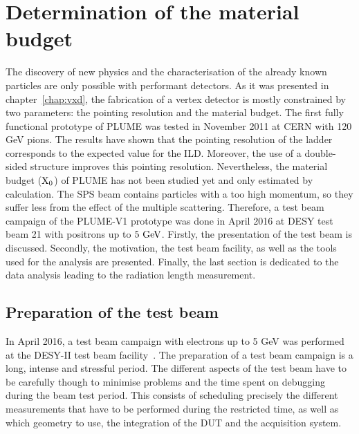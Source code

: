 \chapter{Determination of the material budget}
\label{chap:X0}

  The discovery of new physics and the characterisation of the already known particles are only possible with performant detectors.
  As it was presented in chapter~\ref{chap:vxd}, the fabrication of a vertex detector is mostly constrained by two parameters: the pointing resolution and the material budget.
  The first fully functional prototype of \gls{PLUME} was tested in November 2011 at CERN with 120 GeV pions.
  The results have shown that the pointing resolution of the ladder corresponds to the expected value for the \gls{ILD}.
  Moreover, the use of a double-sided structure improves this pointing resolution. 
  Nevertheless, the material budget ($\rm{X_0}$) of \gls{PLUME} has not been studied yet and only estimated by calculation.
  The \gls{SPS} beam contains particles with a too high momentum, so they suffer less from the effect of the multiple scattering.
  Therefore, a test beam campaign of the PLUME-V1 prototype was done in April 2016 at DESY test beam 21 with positrons up to $5~\rm{GeV}$.
  Firstly, the presentation of the test beam is discussed.
  Secondly, the motivation, the test beam facility, as well as the tools used for the analysis are presented.
  Finally, the last section is dedicated to the data analysis leading to the radiation length measurement.

\minitoc

  \section{Preparation of the test beam}

  In April 2016, a test beam campaign with electrons up to 5 GeV was performed at the DESY-II test beam facility~\cite{DESYII}.
  The preparation of a test beam campaign is a long, intense and stressful period.
  The different aspects of the test beam have to be carefully though to minimise problems and the time spent on debugging during the beam test period.
  This consists of scheduling precisely the different measurements that have to be performed during the restricted time, as well as which geometry to use, the integration of the \gls{DUT} and the acquisition system.
  
